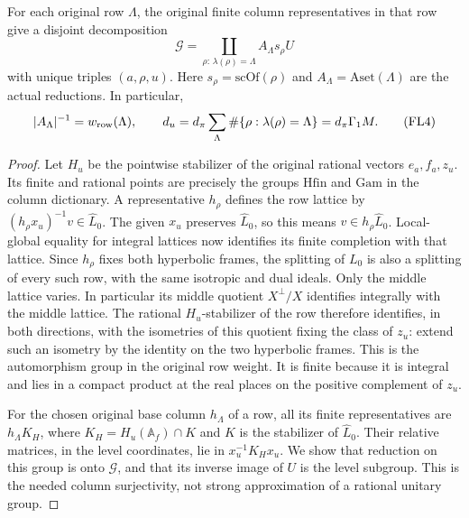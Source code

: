 \begin{lemma}
\label{lem:flag-finite-columns}
For each original row \(\Lambda\), the original finite
column representatives in that row give a disjoint decomposition
\[
 \mathcal G=\coprod_{\rho:\,\lambda(\rho)=\Lambda}
                   A_\Lambda s_\rho U
 \tag{FL3}
\]
with unique triples \((a,\rho,u)\).
Here \(s_\rho=\mathrm{scOf}(\rho)\) and
\(A_\Lambda=\mathrm{Aset}(\Lambda)\) are the actual reductions.
In particular,
\[
 |A_\Lambda|^{-1}=w_{\rm row}(\Lambda),\qquad
 d_u=d_\pi\sum_\Lambda\#\{\rho:\lambda(\rho)=\Lambda\}
     =d_\pi\Gamma_1 M .
 \tag{FL4}
\]
\end{lemma}
\begin{proof}
Let \(H_u\) be the pointwise stabilizer of the original rational
vectors \(e_a,f_a,z_u\). Its finite and rational points are
precisely the groups \(\mathrm{Hfin}\) and \(\mathrm{Gam}\)
in the column dictionary. A representative \(h_\rho\) defines
the row lattice by
\((h_\rho x_u)^{-1}v\in\widehat L_0\). The given \(x_u\) preserves
\(\widehat L_0\), so this means
\(v\in h_\rho\widehat L_0\). Local-global equality for integral
lattices now identifies its finite completion with that lattice.
Since \(h_\rho\) fixes both hyperbolic frames, the splitting
of \(L_0\) is also a splitting of every such row, with the same
isotropic and dual ideals. Only the middle lattice varies.
In particular its middle quotient \(X^\perp/X\) identifies
integrally with the middle lattice. The rational \(H_u\)-stabilizer
of the row therefore identifies, in both directions, with the
isometries of this quotient fixing the class of \(z_u\): extend
such an isometry by the identity on the two hyperbolic frames.
This is the automorphism group in the original row weight.
It is finite because it is integral and lies in a compact
product at the real places on the positive complement of \(z_u\).

For the chosen original base column \(h_\Lambda\) of a row,
all its finite representatives are \(h_\Lambda K_H\), where
\(K_H=H_u(\mathbb A_f)\cap K\) and \(K\) is the stabilizer of
\(\widehat L_0\). Their relative matrices, in the level
coordinates, lie in \(x_u^{-1}K_Hx_u\). We show that reduction
on this group is onto \(\mathcal G\), and that its inverse
image of \(U\) is the level subgroup. This is the needed
column surjectivity, not strong approximation of a rational
unitary group.


\end{proof}
